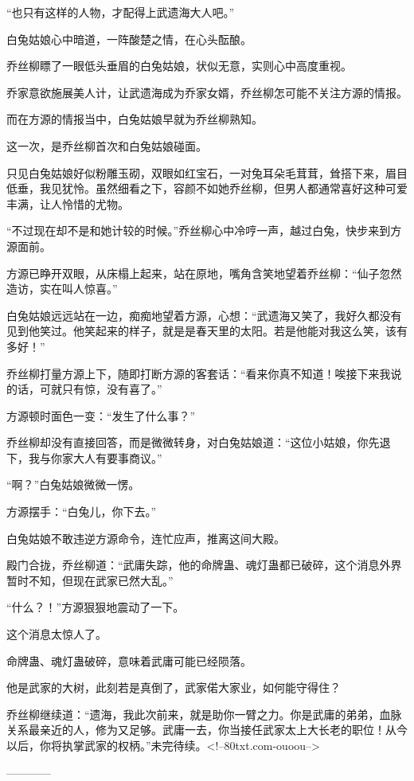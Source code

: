 \begin{this_body}
“也只有这样的人物，才配得上武遗海大人吧。”

白兔姑娘心中暗道，一阵酸楚之情，在心头酝酿。

乔丝柳瞟了一眼低头垂眉的白兔姑娘，状似无意，实则心中高度重视。

乔家意欲施展美人计，让武遗海成为乔家女婿，乔丝柳怎可能不关注方源的情报。

而在方源的情报当中，白兔姑娘早就为乔丝柳熟知。

这一次，是乔丝柳首次和白兔姑娘碰面。

只见白兔姑娘好似粉雕玉砌，双眼如红宝石，一对兔耳朵毛茸茸，耸搭下来，眉目低垂，我见犹怜。虽然细看之下，容颜不如她乔丝柳，但男人都通常喜好这种可爱丰满，让人怜惜的尤物。

“不过现在却不是和她计较的时候。”乔丝柳心中冷哼一声，越过白兔，快步来到方源面前。

方源已睁开双眼，从床榻上起来，站在原地，嘴角含笑地望着乔丝柳：“仙子忽然造访，实在叫人惊喜。”

白兔姑娘远远站在一边，痴痴地望着方源，心想：“武遗海又笑了，我好久都没有见到他笑过。他笑起来的样子，就是是春天里的太阳。若是他能对我这么笑，该有多好！”

乔丝柳打量方源上下，随即打断方源的客套话：“看来你真不知道！唉接下来我说的话，可就只有惊，没有喜了。”

方源顿时面色一变：“发生了什么事？”

乔丝柳却没有直接回答，而是微微转身，对白兔姑娘道：“这位小姑娘，你先退下，我与你家大人有要事商议。”

“啊？”白兔姑娘微微一愣。

方源摆手：“白兔儿，你下去。”

白兔姑娘不敢违逆方源命令，连忙应声，推离这间大殿。

殿门合拢，乔丝柳道：“武庸失踪，他的命牌蛊、魂灯蛊都已破碎，这个消息外界暂时不知，但现在武家已然大乱。”

“什么？！”方源狠狠地震动了一下。

这个消息太惊人了。

命牌蛊、魂灯蛊破碎，意味着武庸可能已经陨落。

他是武家的大树，此刻若是真倒了，武家偌大家业，如何能守得住？

乔丝柳继续道：“遗海，我此次前来，就是助你一臂之力。你是武庸的弟弟，血脉关系最亲近的人，修为又足够。武庸一去，你当接任武家太上大长老的职位！从今以后，你将执掌武家的权柄。”未完待续。<!--80txt.com-ouoou-->

------------

\end{this_body}

